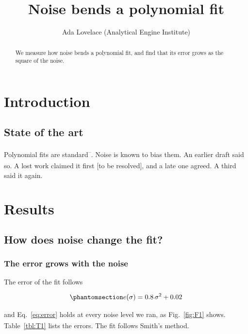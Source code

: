 \documentclass[
]{article}
\title{Noise bends a polynomial fit}
\author{Ada Lovelace (Analytical Engine Institute)}
\date{}
\begin{document}
\maketitle
\begin{abstract}
We measure how noise bends a polynomial fit, and find that its error
grows as the square of the noise.
\end{abstract}

\section{Introduction}\label{introduction}

\subsection{State of the art}\label{introduction-state-of-the-art}

Polynomial fits are
standard\textsuperscript{--}.
Noise is known to bias
them\textsuperscript{}. An earlier draft
said so. A lost work claimed it first {[}to be resolved{]}, and a late
one agreed\textsuperscript{}. A third said it
again.

\section{Results}\label{results}

\subsection{How does noise change the fit?}\label{O1}

\subsubsection{The error grows with the noise}\label{R1}

The error of the fit follows

\begin{equation}\protect\phantomsection\label{eq:error}{ e(\sigma) = 0.8\,\sigma^2 + 0.02 }\end{equation}

and Eq.~\ref{eq:error} holds at every noise level we ran, as
Fig.~\ref{fig:F1} shows. Table~\ref{tbl:T1} lists the errors. The fit
follows Smith's
method\textsuperscript{}.
\end{document}
